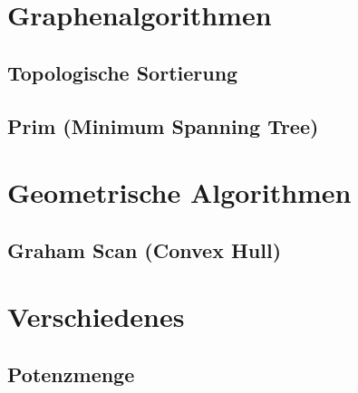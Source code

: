 \documentclass[10pt,a4paper,ngerman]{article}
\begin{document}
\section{Graphenalgorithmen}
\subsection{Topologische Sortierung}

\subsection{Prim (Minimum Spanning Tree)}


\section{Geometrische Algorithmen}
\subsection{Graham Scan (Convex Hull)}


\section{Verschiedenes}
\subsection{Potenzmenge}

\end{document}
